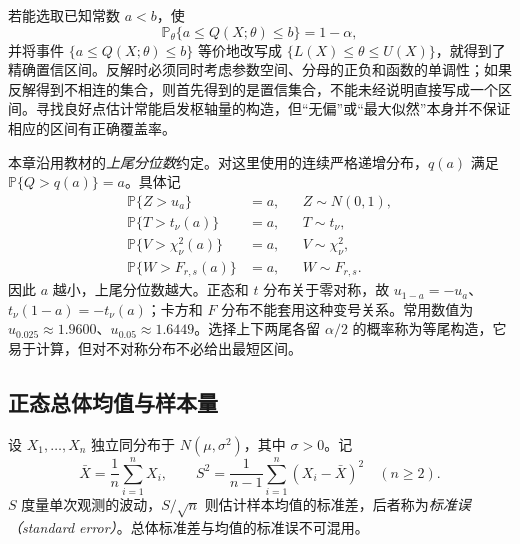 若能选取已知常数 $a<b$，使
\[
  \mathbb P_\theta\{a\le Q(X;\theta)\le b\}=1-\alpha,
\]
并将事件 $\{a\le Q(X;\theta)\le b\}$ 等价地改写成 $\{L(X)\le\theta\le U(X)\}$，就得到了精确置信区间。反解时必须同时考虑参数空间、分母的正负和函数的单调性；如果反解得到不相连的集合，则首先得到的是置信集合，不能未经说明直接写成一个区间。寻找良好点估计常能启发枢轴量的构造，但“无偏”或“最大似然”本身并不保证相应的区间有正确覆盖率。

本章沿用教材的\emph{上尾分位数}约定。对这里使用的连续严格递增分布，$q(a)$ 满足 $\mathbb P\{Q>q(a)\}=a$。具体记
\begin{equation}
  \begin{aligned}
    \mathbb P\{Z>u_a\}&=a, && Z\sim N(0,1),\\
    \mathbb P\{T>t_\nu(a)\}&=a, && T\sim t_\nu,\\
    \mathbb P\{V>\chi_\nu^2(a)\}&=a, && V\sim\chi_\nu^2,\\
    \mathbb P\{W>F_{r,s}(a)\}&=a, && W\sim F_{r,s}.
  \end{aligned}
  \label{eq:study-upper-quantiles}
\end{equation}
因此 $a$ 越小，上尾分位数越大。正态和 $t$ 分布关于零对称，故 $u_{1-a}=-u_a$、$t_\nu(1-a)=-t_\nu(a)$；卡方和 $F$ 分布不能套用这种变号关系。常用数值为 $u_{0.025}\approx1.9600$、$u_{0.05}\approx1.6449$。选择上下两尾各留 $\alpha/2$ 的概率称为等尾构造，它易于计算，但对不对称分布不必给出最短区间。

\subsection{正态总体均值与样本量}
\label{subsec:study-normal-mean-intervals}

设 $X_1,\ldots,X_n$ 独立同分布于 $N(\mu,\sigma^2)$，其中 $\sigma>0$。记
\begin{equation}
  \bar X=\frac1n\sum_{i=1}^nX_i,\qquad
  S^2=\frac1{n-1}\sum_{i=1}^n(X_i-\bar X)^2\quad(n\ge2).
  \label{eq:study-interval-sample-statistics}
\end{equation}
$S$ 度量单次观测的波动，$S/\sqrt n$ 则估计样本均值的标准差，后者称为\emph{标准误（standard error）}。总体标准差与均值的标准误不可混用。

